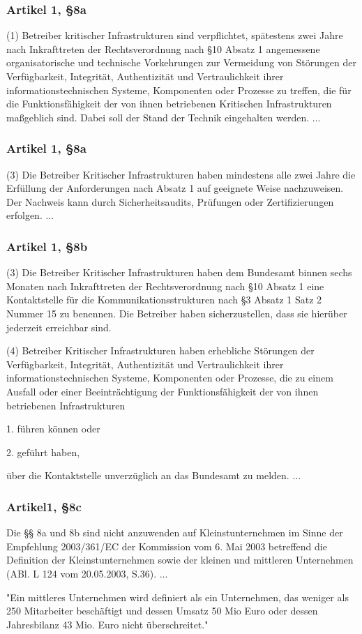 \documentclass[11pt]{beamer}
\begin{document}
	\begin{frame}
		\frametitle{Artikel 1, §8a}
		(1) Betreiber kritischer Infrastrukturen sind verpflichtet, spätestens zwei Jahre nach Inkrafttreten der Rechtsverordnung nach §10 Absatz 1 angemessene organisatorische und technische Vorkehrungen zur Vermeidung von Störungen der Verfügbarkeit, Integrität, Authentizität und Vertraulichkeit ihrer informationstechnischen Systeme, Komponenten oder Prozesse zu treffen, die für die Funktionsfähigkeit der von ihnen betriebenen Kritischen Infrastrukturen maßgeblich sind. Dabei soll der Stand der Technik eingehalten werden. ...
	\end{frame}	

	\begin{frame}
		\frametitle{Artikel 1, §8a}
		(3) Die Betreiber Kritischer Infrastrukturen haben mindestens alle zwei Jahre die Erfüllung der Anforderungen nach Absatz 1 auf geeignete Weise nachzuweisen. Der Nachweis kann durch Sicherheitsaudits, Prüfungen oder Zertifizierungen erfolgen. ...
	\end{frame}	

	\begin{frame}
		\frametitle{Artikel 1, §8b}
		(3) Die Betreiber Kritischer Infrastrukturen haben dem Bundesamt binnen sechs Monaten nach Inkrafttreten der Rechtsverordnung nach §10 Absatz 1 eine Kontaktstelle für die Kommunikationsstrukturen nach §3 Absatz 1 Satz 2 Nummer 15 zu benennen. Die Betreiber haben sicherzustellen, dass sie hierüber jederzeit erreichbar sind.
		
		(4) Betreiber Kritischer Infrastrukturen haben erhebliche Störungen der Verfügbarkeit, Integrität, Authentizität und Vertraulichkeit ihrer informationstechnischen Systeme, Komponenten oder Prozesse, die zu einem Ausfall oder einer Beeinträchtigung der Funktionsfähigkeit der von ihnen betriebenen Infrastrukturen  
		
		1. führen können oder
		
		2. geführt haben,
		
		über die Kontaktstelle unverzüglich an das Bundesamt zu melden. ...
	\end{frame}	
	
	\begin{frame}
		\frametitle{Artikel1, §8c}
		Die §§ 8a und 8b sind nicht anzuwenden auf Kleinstunternehmen im Sinne der Empfehlung 2003/361/EC der Kommission vom 6. Mai 2003 betreffend die Definition der Kleinstunternehmen sowie der kleinen und mittleren Unternehmen (ABl. L 124 vom 20.05.2003, S.36). ...
		
		"Ein mittleres Unternehmen wird definiert als ein Unternehmen, das weniger als 250 Mitarbeiter beschäftigt und dessen Umsatz 50 Mio Euro oder dessen Jahresbilanz 43 Mio. Euro nicht überschreitet."
	\end{frame}
	
\end{document}
